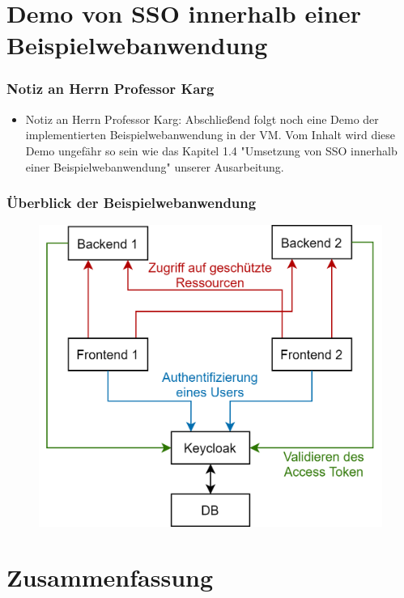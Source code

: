\documentclass{beamer}
\begin{document}
\section{Demo von SSO innerhalb einer Beispielwebanwendung}

\begin{frame}
\frametitle{Notiz an Herrn Professor Karg}
\begin{itemize}
\item Notiz an Herrn Professor Karg: Abschließend folgt noch eine Demo der implementierten Beispielwebanwendung in der VM. Vom Inhalt wird diese Demo ungefähr so sein wie das Kapitel 1.4 "Umsetzung von SSO innerhalb einer Beispielwebanwendung" unserer Ausarbeitung.
\end{itemize}
\end{frame}

\begin{frame}
\frametitle{Überblick der Beispielwebanwendung}
\begin{figure}
\includegraphics[width=.7\linewidth]{img/ArchitectureDiagram.png}
\end{figure}
\end{frame}

\section{Zusammenfassung}
\end{document}
